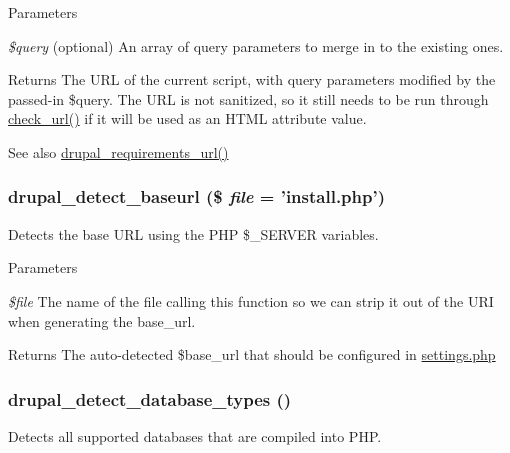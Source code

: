 \begin{DoxyParams}{Parameters}
\item[{\em \$query}](optional) An array of query parameters to merge in to the existing ones.\end{DoxyParams}
\begin{DoxyReturn}{Returns}
The URL of the current script, with query parameters modified by the passed-\/in \$query. The URL is not sanitized, so it still needs to be run through \hyperlink{group__sanitization_gac024315b69035ef05c33674838707919}{check\_\-url()} if it will be used as an HTML attribute value.
\end{DoxyReturn}
\begin{DoxySeeAlso}{See also}
\hyperlink{install_8inc_aa26d690c87ca7a7a2aedd9cd4679274a}{drupal\_\-requirements\_\-url()} 
\end{DoxySeeAlso}
\hypertarget{install_8inc_a1b5de87184840c5b386aa8f109271b9e}{
\subsubsection[{drupal\_\-detect\_\-baseurl}]{\setlength{\rightskip}{0pt plus 5cm}drupal\_\-detect\_\-baseurl (\$ {\em file} = {\ttfamily 'install.php'})}}
\label{install_8inc_a1b5de87184840c5b386aa8f109271b9e}
Detects the base URL using the PHP \$\_\-SERVER variables.


\begin{DoxyParams}{Parameters}
\item[{\em \$file}]The name of the file calling this function so we can strip it out of the URI when generating the base\_\-url.\end{DoxyParams}
\begin{DoxyReturn}{Returns}
The auto-\/detected \$base\_\-url that should be configured in \hyperlink{settings_8php}{settings.php} 
\end{DoxyReturn}
\hypertarget{install_8inc_a714eb7ff779f55f4b330a995f9f92cd4}{
\subsubsection[{drupal\_\-detect\_\-database\_\-types}]{\setlength{\rightskip}{0pt plus 5cm}drupal\_\-detect\_\-database\_\-types ()}}
\label{install_8inc_a714eb7ff779f55f4b330a995f9f92cd4}
Detects all supported databases that are compiled into PHP.


